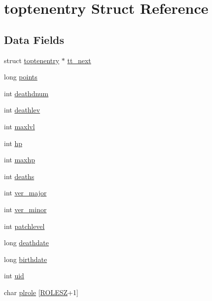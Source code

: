 \hypertarget{structtoptenentry}{\section{toptenentry Struct Reference}
\label{structtoptenentry}
}
\subsection*{Data Fields}
\begin{DoxyCompactItemize}
\item 
struct \hyperlink{structtoptenentry}{toptenentry} $\ast$ \hyperlink{structtoptenentry_ae73ae2ba838b18d1c8744f6c4735c768}{tt\+\_\+next}
\item 
long \hyperlink{structtoptenentry_a6d848e2af2fe840605e707e914395584}{points}
\item 
int \hyperlink{structtoptenentry_a505b721116a47adbd7ccfaf8a58bad96}{deathdnum}
\item 
int \hyperlink{structtoptenentry_a61b1f3fa6f066f1ca962c34e4c4e48af}{deathlev}
\item 
int \hyperlink{structtoptenentry_a7584f5f58a62ce331c87c6751581e8b0}{maxlvl}
\item 
int \hyperlink{structtoptenentry_a6190d60218b470dbdbe6952f0f8f3748}{hp}
\item 
int \hyperlink{structtoptenentry_af73023379d229a55babd99cbe7c10c2a}{maxhp}
\item 
int \hyperlink{structtoptenentry_a831da8fec0aa7c228c73bfdedfb4500b}{deaths}
\item 
int \hyperlink{structtoptenentry_a91bee7d2843edbebe8e9c140c7117ce2}{ver\+\_\+major}
\item 
int \hyperlink{structtoptenentry_a13b543c05d6cca789358c7d9e12e517d}{ver\+\_\+minor}
\item 
int \hyperlink{structtoptenentry_a0b8165c6cd4ec2865b0974cc7a0a849f}{patchlevel}
\item 
long \hyperlink{structtoptenentry_a4f6b60626cd0c1fac745178de2c5a6c9}{deathdate}
\item 
long \hyperlink{structtoptenentry_a3c03a444fb83e6d57b50ad60e178f6d8}{birthdate}
\item 
int \hyperlink{structtoptenentry_a95aa1dca4fdf2bdc4650909b3f0d1012}{uid}
\item 
char \hyperlink{structtoptenentry_acd6a0949037e46d3e20d2d2965327fa6}{plrole} \mbox{[}\hyperlink{topten_8c_a2765a7987f7f846aa68856bd97b44ffb}{R\+O\+L\+E\+S\+Z}+1\mbox{]}
\item 

\end{DoxyCompactItemize}

